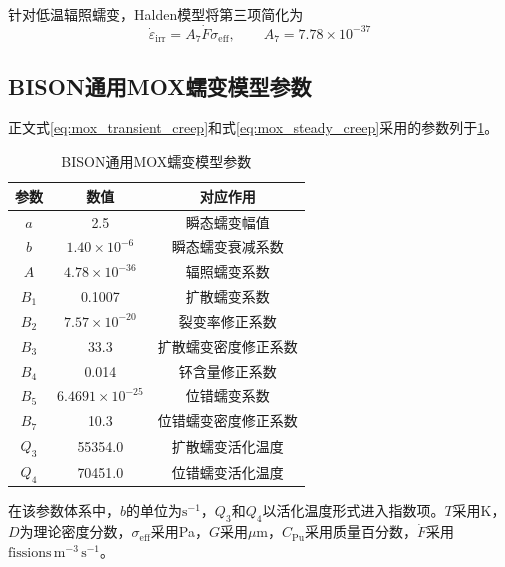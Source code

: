 针对低温辐照蠕变，Halden模型将第三项简化为\cite{hwr-1039}
\begin{equation}
	\dot{\varepsilon}_{\mathrm{irr}}
	=A_7\dot{F}\sigma_{\mathrm{eff}},
	\qquad A_7=7.78\times10^{-37}
	\label{eq:appendix_halden_irradiation_creep}
\end{equation}

\subsection{BISON通用MOX蠕变模型参数}

正文式\eqref{eq:mox_transient_creep}和式\eqref{eq:mox_steady_creep}采用的参数列于\tablename\ref{tab:appendix_bison_mox_creep_parameters}。

\begin{table}[htbp]
	\centering
	\caption{BISON通用MOX蠕变模型参数}
	\label{tab:appendix_bison_mox_creep_parameters}
	\begin{tabular*}{\textwidth}{
			@{\extracolsep{\fill}}
			ccc
			@{}
		}
		\toprule
		参数 & 数值 & 对应作用 \\
		\midrule
		$a$   & 2.5                      & 瞬态蠕变幅值 \\
		$b$   & $1.40\times10^{-6}$      & 瞬态蠕变衰减系数 \\
		$A$   & $4.78\times10^{-36}$     & 辐照蠕变系数 \\
		$B_1$ & 0.1007                   & 扩散蠕变系数 \\
		$B_2$ & $7.57\times10^{-20}$     & 裂变率修正系数 \\
		$B_3$ & 33.3                     & 扩散蠕变密度修正系数 \\
		$B_4$ & 0.014                    & 钚含量修正系数 \\
		$B_5$ & $6.4691\times10^{-25}$   & 位错蠕变系数 \\
		$B_7$ & 10.3                     & 位错蠕变密度修正系数 \\
		$Q_3$ & 55354.0                  & 扩散蠕变活化温度 \\
		$Q_4$ & 70451.0                  & 位错蠕变活化温度 \\
		\bottomrule
	\end{tabular*}
\end{table}

在该参数体系中，$b$的单位为$\mathrm{s^{-1}}$，$Q_3$和$Q_4$以活化温度形式进入指数项。$T$采用K，$D$为理论密度分数，$\sigma_{\mathrm{eff}}$采用Pa，$G$采用$\mu\mathrm{m}$，$C_{\mathrm{Pu}}$采用质量百分数，$\dot{F}$采用$\mathrm{fissions\,m^{-3}\,s^{-1}}$。

